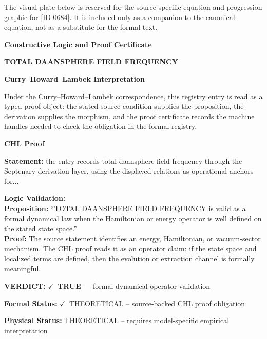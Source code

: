 \begingroup\footnotesize\sloppy
The visual plate below is reserved for the source-specific equation and progression graphic for [ID 0684]. It is included only as a companion to the canonical equation, not as a substitute for the formal text.
\par\endgroup
\ifTZPDarkEdition
{}
\fi

\clearpage
\begingroup\tzpsupportsetup
\noindent\textbf{\fontsize{10.8pt}{12.8pt}\selectfont [ID 0684] Constructive Logic and Proof Certificate}\par
\noindent\textbf{\fontsize{10pt}{12pt}\selectfont TOTAL DAANSPHERE FIELD FREQUENCY}\par
\vspace{0.45em}
\begingroup
\footnotesize
\setlength{\parskip}{0.22em}
\setlength{\parindent}{0pt}
\noindent\textbf{Curry--Howard--Lambek Interpretation}\par
Under the Curry--Howard--Lambek correspondence, this registry entry is read as a typed proof
object: the stated source condition supplies the proposition, the derivation supplies the
morphism, and the proof certificate records the machine handles needed to check the obligation
in the formal registry.

\vspace{0.45em}
\noindent\textbf{CHL Proof}\par
\textbf{Statement:} the entry records total daansphere field frequency through the Septenary derivation
layer, using the displayed relations as operational anchors for...

\textbf{Logic Validation:}\\
\textbf{Proposition:} ``TOTAL DAANSPHERE FIELD FREQUENCY is valid as a formal dynamical law when the Hamiltonian
or energy operator is well defined on the stated state space.''\\
\textbf{Proof:} The source statement identifies an energy, Hamiltonian, or vacuum-sector mechanism. The
CHL proof reads it as an operator claim: if the state space and localized terms are
defined, then the evolution or extraction channel is formally meaningful.

\textbf{VERDICT:} \ensuremath{\checkmark}\ \textbf{TRUE} --- formal dynamical-operator validation

\textbf{Formal Status:} \ensuremath{\checkmark}\ THEORETICAL -- source-backed CHL proof obligation

\textbf{Physical Status:} THEORETICAL -- requires model-specific empirical interpretation
\par\vspace{0.45em}
\par
\ifTZPDarkEdition
{}
\fi
\endgroup
\endgroup
